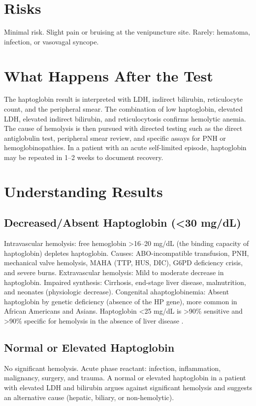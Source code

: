 \section*{Risks}
Minimal risk. Slight pain or bruising at the venipuncture site. Rarely: hematoma, infection, or vasovagal syncope.
\section*{What Happens After the Test}
The haptoglobin result is interpreted with LDH, indirect bilirubin, reticulocyte count, and the peripheral smear. The combination of low haptoglobin, elevated LDH, elevated indirect bilirubin, and reticulocytosis confirms hemolytic anemia. The cause of hemolysis is then pursued with directed testing such as the direct antiglobulin test, peripheral smear review, and specific assays for PNH or hemoglobinopathies. In a patient with an acute self-limited episode, haptoglobin may be repeated in 1--2 weeks to document recovery.
\section*{Understanding Results}
\subsection*{Decreased/Absent Haptoglobin (<30 mg/dL)}
Intravascular hemolysis: free hemoglobin >16--20 mg/dL (the binding capacity of haptoglobin) depletes haptoglobin. Causes: ABO-incompatible transfusion, PNH, mechanical valve hemolysis, MAHA (TTP, HUS, DIC), G6PD deficiency crisis, and severe burns. Extravascular hemolysis: Mild to moderate decrease in haptoglobin. Impaired synthesis: Cirrhosis, end-stage liver disease, malnutrition, and neonates (physiologic decrease). Congenital ahaptoglobinemia: Absent haptoglobin by genetic deficiency (absence of the HP gene), more common in African Americans and Asians. Haptoglobin <25 mg/dL is >90\% sensitive and >90\% specific for hemolysis in the absence of liver disease \cite{marchand1980predictive}.
\subsection*{Normal or Elevated Haptoglobin}
No significant hemolysis. Acute phase reactant: infection, inflammation, malignancy, surgery, and trauma. A normal or elevated haptoglobin in a patient with elevated LDH and bilirubin argues against significant hemolysis and suggests an alternative cause (hepatic, biliary, or non-hemolytic).
